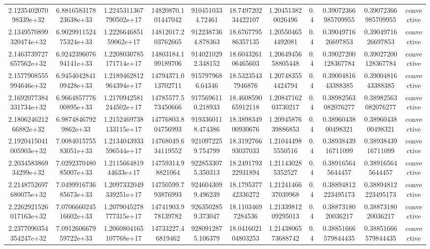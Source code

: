 \begin{table}
\begin{tabular}{ccccccccccc}
2.123540207098339e+32 & 6.881658317823638e+33 & 1.2245311367790502e+17 & 14820870.101447042 & 9104510334.72461 & 18.749720234422107 & 1.204513820026496 & 0.4 & 0.39072366985709955 & 0.39072366985709955 & convective \\
2.1349570899320474e+32 & 6.902991152475324e+33 & 1.222664685159062e+17 & 14812017.203762665 & 9122387364.878363 & 18.676779586357135 & 1.205504654492081 & 0.4 & 0.3904971626697853 & 0.3904971626697853 & convective \\
2.1463739727657562e+32 & 6.924239607694141e+33 & 1.2208030785171714e+17 & 14803184.199189706 & 9140210292.348152 & 18.604326106465603 & 1.2064945658805448 & 0.4 & 0.39027200128367784 & 0.39027200128367784 & convective \\
2.1577908555994646e+32 & 6.945404284109428e+33 & 1.2189462812964394e+17 & 14794371.013702711 & 9157979686.64346 & 18.53235437946876 & 1.207483554424794 & 0.4 & 0.3900481643388385 & 0.3900481643388385 & convective \\
2.1692077384331734e+32 & 6.966485777600895e+33 & 1.2170942581244502e+17 & 14785577.573450666 & 9175696110.218933 & 18.460859065912118 & 1.2084716203730217 & 0.4 & 0.38982563082076277 & 0.38982563082076277 & convective \\
2.180624621266882e+32 & 6.98748467929862e+33 & 1.2152469738133115e+17 & 14776803.804756993 & 9193360118.474386 & 18.389834900930676 & 1.2094587639886853 & 0.4 & 0.3896043800498321 & 0.3896043800498321 & convective \\
2.1920415041005903e+32 & 7.008401575583051e+33 & 1.2134043933596544e+17 & 14768049.634119552 & 9210972259.754799 & 18.319276693037033 & 1.210444985550516 & 0.4 & 0.3893843916711099 & 0.3893843916711099 & convective \\
2.203458386934299e+32 & 7.029237048085007e+33 & 1.211566481944633e+17 & 14759314.98821064 & 9228533075.350313 & 18.249179322931894 & 1.211430285352527 & 0.4 & 0.389165645644457 & 0.389165645644457 & convective \\
2.2148752697680075e+32 & 7.049991673685673e+33 & 1.2097332049339251e+17 & 14750599.793876993 & 9246043099.496239 & 18.179537742336272 & 1.2124146637039968 & 0.4 & 0.38894812223495173 & 0.38894812223495173 & convective \\
2.2262921526017163e+32 & 7.070666024516602e+33 & 1.2079045278777315e+17 & 14741903.978139782 & 9263502859.373047 & 18.11034697284536 & 1.2133981209295013 & 0.4 & 0.3887318020036217 & 0.3887318020036217 & convective \\
2.2377090354354247e+32 & 7.091260667959722e+33 & 1.2060804165107768e+17 & 14733227.46819462 & 9280912875.106379 & 18.041602104803253 & 1.2143806573688742 & 0.4 & 0.38851666579844435 & 0.38851666579844435 & convective \\

\end{tabular}
\end{table}
